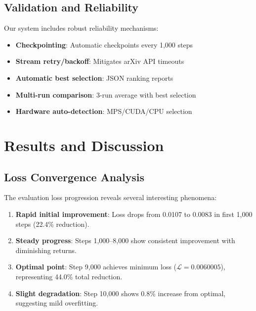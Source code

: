 \documentclass[11pt,a4paper,twocolumn]{article}
\theoremstyle{plain}
\theoremstyle{definition}
\newcommand{\loss}{\mathcal{L}}
\begin{document}
\subsection{Validation and Reliability}

Our system includes robust reliability mechanisms:

\begin{itemize}[leftmargin=*,itemsep=0pt]
    \item \textbf{Checkpointing}: Automatic checkpoints every 1,000 steps
    \item \textbf{Stream retry/backoff}: Mitigates arXiv API timeouts
    \item \textbf{Automatic best selection}: JSON ranking reports
    \item \textbf{Multi-run comparison}: 3-run average with best selection
    \item \textbf{Hardware auto-detection}: MPS/CUDA/CPU selection
\end{itemize}

\section{Results and Discussion}

\subsection{Loss Convergence Analysis}

The evaluation loss progression reveals several interesting 
phenomena:

\begin{enumerate}[leftmargin=*,itemsep=0pt]
    \item \textbf{Rapid initial improvement}: Loss drops from 0.0107 
    to 0.0083 in first 1,000 steps (22.4\% reduction).
    
    \item \textbf{Steady progress}: Steps 1,000--8,000 show consistent 
    improvement with diminishing returns.
    
    \item \textbf{Optimal point}: Step 9,000 achieves minimum loss 
    ($\loss = 0.0060005$), representing 44.0\% total reduction.
    
    \item \textbf{Slight degradation}: Step 10,000 shows 0.8\% increase 
    from optimal, suggesting mild overfitting.
\end{enumerate}
\end{document}
